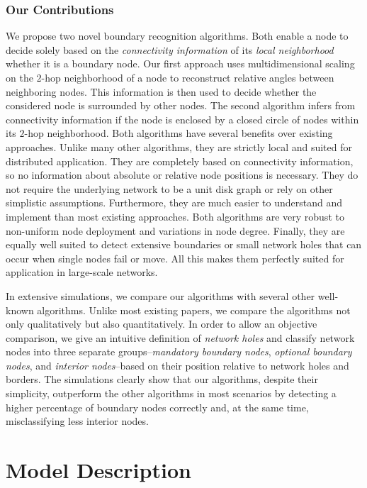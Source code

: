 \documentclass{llncs}
\begin{document}
\subsubsection{Our Contributions}
We propose two novel boundary recognition algorithms.
Both enable a node to decide solely based on the \emph{connectivity information} of its \emph{local neighborhood} whether it is a boundary node.
Our first approach uses multidimensional scaling on the $2$-hop neighborhood of a node to reconstruct relative angles between neighboring nodes.
This information is then used to decide whether the considered node is surrounded by other nodes.
The second algorithm infers from connectivity information if the node is enclosed by a closed circle of nodes within its $2$-hop neighborhood.
Both algorithms have several benefits over existing approaches.
Unlike many other algorithms, they are strictly local and suited for distributed application.
They are completely based on connectivity information, so no information about absolute or relative node positions is necessary.
They do not require the underlying network to be a unit disk graph or rely on other simplistic assumptions.
Furthermore, they are much easier to understand and implement than most existing approaches.
Both algorithms are very robust to non-uniform node deployment and variations in node degree.
Finally, they are equally well suited to detect extensive boundaries or small network holes that can occur when single nodes fail or move.
All this makes them perfectly suited for application in large-scale networks.
    
In extensive simulations, we compare our algorithms with several other well-known algorithms.
Unlike most existing papers, we compare the algorithms not only qualitatively but also quantitatively.
In order to allow an objective comparison, we give an intuitive definition of \emph{network holes} and classify network nodes into three separate groups--\emph{mandatory boundary nodes}, \emph{optional boundary nodes}, and \emph{interior nodes}--based on their position relative to network holes and borders.
The simulations clearly show that our algorithms, despite their simplicity, outperform the other algorithms in most scenarios by detecting a higher percentage of boundary nodes correctly and, at the same time, misclassifying less interior nodes.


\section{Model Description}\label{sec:model}
\end{document}
